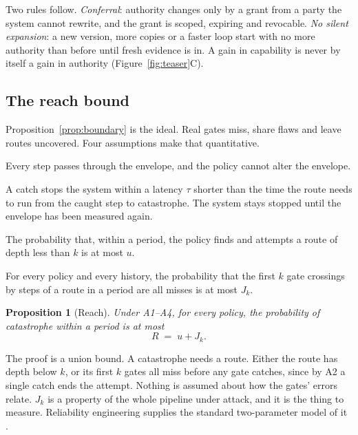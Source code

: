 \documentclass[10pt,twocolumn]{article}
\theoremstyle{plain}
\newtheorem{proposition}{Proposition}
\theoremstyle{definition}
\begin{document}
Two rules follow. \emph{Conferral}: authority changes only by a grant from a party the system
cannot rewrite, and the grant is scoped, expiring and revocable. \emph{No silent expansion}:
a new version, more copies or a faster loop start with no more authority than before until
fresh evidence is in. A gain in capability is never by itself a gain in authority
(Figure~\ref{fig:teaser}C).

\subsection{The reach bound}

Proposition~\ref{prop:boundary} is the ideal. Real gates miss, share flaws and leave routes
uncovered. Four assumptions make that quantitative.

\begin{description}[leftmargin=1.3em,labelindent=0pt,itemsep=2pt,topsep=3pt]
\item[A1 (Mediation).] Every step passes through the envelope, and the policy cannot alter
the envelope.
\item[A2 (Halt on catch).] A catch stops the system within a latency $\tau$ shorter than the
time the route needs to run from the caught step to catastrophe. The system stays stopped
until the envelope has been measured again.
\item[A3 (Coverage).] The probability that, within a period, the policy finds and attempts a
route of depth less than $k$ is at most $u$.
\item[A4 (Joint miss).] For every policy and every history, the probability that the first
$k$ gate crossings by steps of a route in a period are all misses is at most $J_{k}$.
\end{description}

\begin{proposition}[Reach]\label{prop:reach}
Under A1--A4, for every policy, the probability of catastrophe within a period is at most
\[
R \;=\; u + J_{k}.
\]
\end{proposition}

The proof is a union bound. A catastrophe needs a route. Either the route has depth below
$k$, or its first $k$ gates all miss before any gate catches, since by A2 a single catch ends
the attempt. Nothing is assumed about how the gates' errors relate. $J_{k}$ is a property of
the whole pipeline under attack, and it is the thing to measure. Reliability engineering
supplies the standard two-parameter model of it \cite{fleming1975,mosleh1988}.
\end{document}
